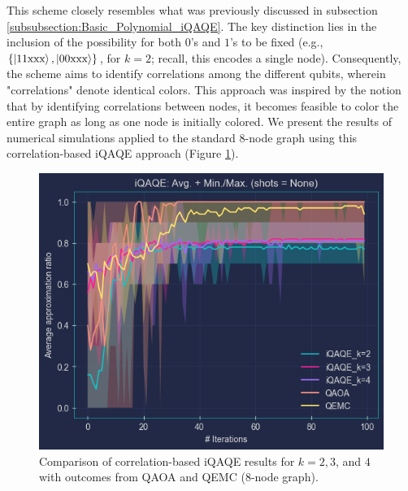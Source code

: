 This scheme closely resembles what was previously discussed in subsection \ref{subsubsection:Basic_Polynomial_iQAQE}. The key distinction lies in the inclusion of the possibility for both $0$'s and $1$'s to be fixed (e.g., $\{\ket{11\text{xxx}}, \ket{00\text{xxx}}\}$, for $k = 2$; recall, this encodes a single node). Consequently, the scheme aims to identify correlations among the different qubits, wherein "correlations" denote identical colors. This approach was inspired by the notion that by identifying correlations between nodes, it becomes feasible to color the entire graph as long as one node is initially colored. We present the results of numerical simulations applied to the standard $8$-node graph using this correlation-based iQAQE approach (Figure \ref{fig:Correlation/k=2,3,4}).



\begin{figure}[H]
    \centering
    \includegraphics[width=0.95\columnwidth]{Figures/Correlation-based/k=2_3_4.png}
    \caption{Comparison of correlation-based iQAQE results for $k=2, 3$, and $4$ with outcomes from QAOA and QEMC ($8$-node graph).}
    \label{fig:Correlation/k=2,3,4}
\end{figure}

